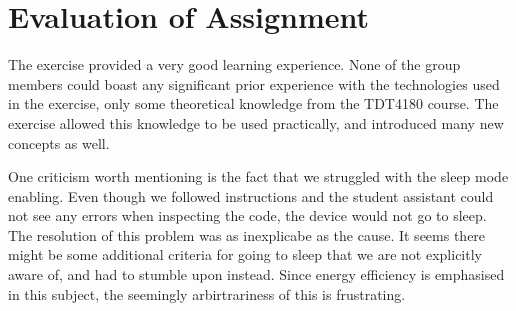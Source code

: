 \chapter{Evaluation of Assignment}
The exercise provided a very good learning experience. None of the group members could boast any significant prior experience with the technologies used in the exercise, only some theoretical knowledge from the TDT4180 course. The exercise allowed this knowledge to be used practically, and introduced many new concepts as well.

One criticism worth mentioning is the fact that we struggled with the sleep mode enabling. Even though we followed instructions and the student assistant could not see any errors when inspecting the code, the device would not go to sleep. The resolution of this problem was as inexplicabe as the cause. It seems there might be some additional criteria for going to sleep that we are not explicitly aware of, and had to stumble upon instead. Since energy efficiency is emphasised in this subject, the seemingly arbirtrariness of this is frustrating.
